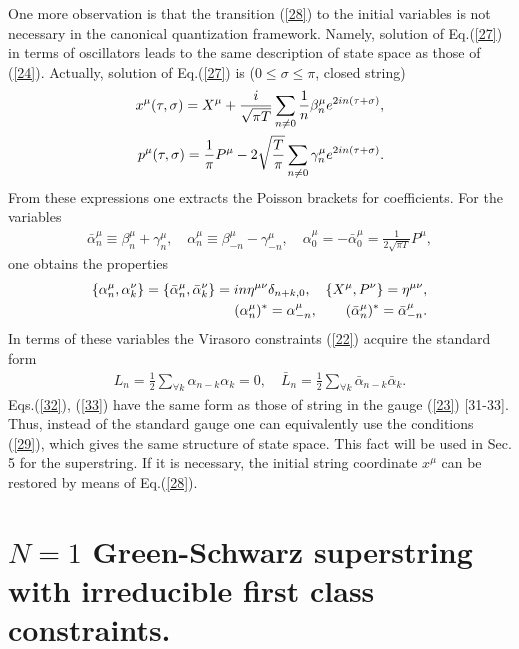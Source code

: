 \documentclass[a4paper]{article}
\begin{document}
One more observation is that the transition (\ref{28}) to the initial 
variables is not necessary in the canonical quantization framework. 
Namely, solution of Eq.(\ref{27}) in terms of oscillators leads to the 
same description of state space as those of (\ref{24}). Actually, 
solution of Eq.(\ref{27}) is ($0\le\sigma\le\pi$, closed string)
\begin{eqnarray}\label{30}
x^\mu(\tau, \sigma)=X^\mu+\frac{i}{\sqrt{\pi T}}\sum_{n\ne 0}\frac 1n
\beta_n^\mu e^{2in(\tau+\sigma)}, \cr
p^\mu(\tau, \sigma)=
\frac{1}{\pi}P^\mu-2\sqrt{\frac{T}{\pi}}\sum_{n\ne 0}
\gamma_n^\mu e^{2in(\tau+\sigma)}.
\end{eqnarray}
From these expressions one extracts the Poisson brackets for  
coefficients. For the variables 
\begin{eqnarray}\label{31}
\bar\alpha_n^\mu\equiv\beta_n^\mu+\gamma_n^\mu, \quad 
\alpha_n^\mu\equiv\beta_{-n}^\mu-\gamma_{-n}^\mu, \quad
\alpha_0^\mu=-\bar\alpha_0^\mu=\frac{1}{2\sqrt{\pi T}}P^\mu,
\end{eqnarray}
one obtains the properties
\begin{eqnarray}\label{32}
\{\alpha_n^\mu, \alpha_k^\nu\}=
\{\bar\alpha_n^\mu, \bar\alpha_k^\nu\}=
in\eta^{\mu\nu}\delta_{n+k,0}, \quad 
\{X^\mu, P^\nu\}=\eta^{\mu\nu}, \cr
(\alpha_n^\mu)^*= \alpha_{-n}^\mu, \qquad 
(\bar\alpha_n^\mu)^*=\bar \alpha_{-n}^\mu. 
\end{eqnarray}
In terms of these variables the Virasoro constraints (\ref{22}) 
acquire the standard form
\begin{eqnarray}\label{33}
L_n=\frac 12\sum_{\forall k}\alpha_{n-k}\alpha_k=0, \quad
\bar L_n=\frac 12\sum_{\forall k}\bar\alpha_{n-k}
\bar\alpha_k.
\end{eqnarray}
Eqs.(\ref{32}), (\ref{33}) have the same form as those of string in the 
gauge (\ref{23}) [31-33]. Thus, instead of the standard gauge one 
can equivalently use the conditions (\ref{29}), which gives the same 
structure of state space. This fact will be used in Sec. 5 for the 
superstring. If it is necessary, the initial string coordinate $x^\mu$ 
can be restored by means of Eq.(\ref{28}).

\section{$N=1$ Green-Schwarz superstring with irreducible first 
class constraints.}
\end{document}
